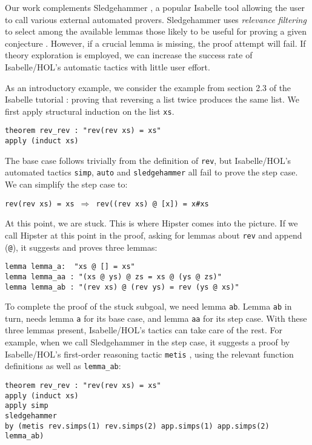 Our work complements Sledgehammer \cite{sledgehammer}, a popular Isabelle tool allowing the user to call various external automated provers. Sledgehammer uses \emph{relevance filtering} to select among the available lemmas those likely to be useful for proving a given conjecture \cite{mash}. However, if a crucial lemma is missing, the proof attempt will fail. If theory exploration is employed, we can increase the success rate 
of Isabelle/HOL's automatic tactics with little user effort. 

As an introductory example, we consider the example from section 2.3 of the Isabelle tutorial \cite{isabelle}: proving that reversing a list twice produces the same list. We first apply structural induction on the list \texttt{xs}.
\begin{verbatim}
theorem rev_rev : "rev(rev xs) = xs"
apply (induct xs)
\end{verbatim}
The base case follows trivially from the definition of \texttt{rev},
but Isabelle/HOL's automated tactics \texttt{simp}, \texttt{auto} and
\texttt{sledgehammer} all fail to prove the step case. We can simplify the step case to:
\begin{center}
\texttt{rev(rev  xs) = xs $\Longrightarrow$ rev((rev xs) @ [x]) = x\#xs}
\end{center}
At this point, we are stuck.
This is where Hipster comes into the picture. If we call Hipster at
this point in the proof, asking for lemmas about \texttt{rev} and
append (\texttt{@}), it suggests and proves three lemmas:
\begin{verbatim}
lemma lemma_a:  "xs @ [] = xs"
lemma lemma_aa : "(xs @ ys) @ zs = xs @ (ys @ zs)"
lemma lemma_ab : "(rev xs) @ (rev ys) = rev (ys @ xs)"
\end{verbatim}

To complete the proof of the stuck subgoal, we need lemma \texttt{ab}. Lemma \texttt{ab} in turn, needs lemma \texttt{a} for its base case, and lemma \texttt{aa} for its step case. With these three lemmas present, Isabelle/HOL's tactics can take care of the rest. For example, when we call Sledgehammer in the step case, it suggests a proof by Isabelle/HOL's first-order reasoning tactic \texttt{metis} \cite{metis}, using the relevant function definitions as well as \texttt{lemma\_ab}:
\begin{small}
\begin{verbatim}
theorem rev_rev : "rev(rev xs) = xs"
apply (induct xs)
apply simp
sledgehammer
by (metis rev.simps(1) rev.simps(2) app.simps(1) app.simps(2) lemma_ab)
\end{verbatim}
\end{small}
 
